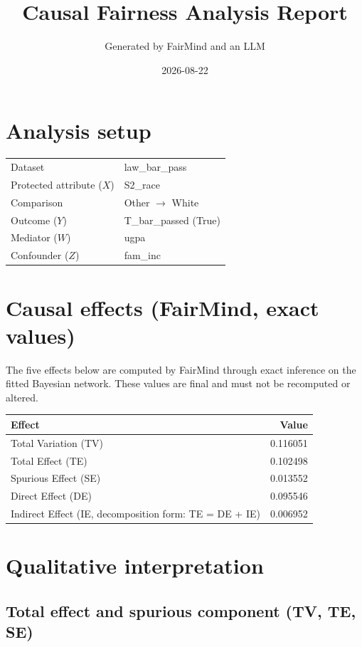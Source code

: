 \documentclass[11pt]{article}
\title{Causal Fairness Analysis Report}
\author{Generated by FairMind and an LLM}
\date{2026-08-22}
\begin{document}
\maketitle

\section{Analysis setup}

\begin{tabular}{ll}
\toprule
Dataset & law\_bar\_pass \\
Protected attribute ($X$) & S2\_race \\
Comparison & Other $\to$ White \\
Outcome ($Y$) & T\_bar\_passed (True) \\
Mediator ($W$) & ugpa \\
Confounder ($Z$) & fam\_inc \\
\bottomrule
\end{tabular}

\section{Causal effects (FairMind, exact values)}

The five effects below are computed by FairMind through exact inference on the
fitted Bayesian network. These values are final and must not be recomputed or
altered.

\begin{tabular}{lr}
\toprule
Effect & Value \\
\midrule
Total Variation (TV) & 0.116051 \\
Total Effect (TE) & 0.102498 \\
Spurious Effect (SE) & 0.013552 \\
Direct Effect (DE) & 0.095546 \\
Indirect Effect (IE, decomposition form: TE = DE + IE) & 0.006952 \\
\bottomrule
\end{tabular}

\section{Qualitative interpretation}

\subsection{Total effect and spurious component (TV, TE, SE)}
\end{document}
